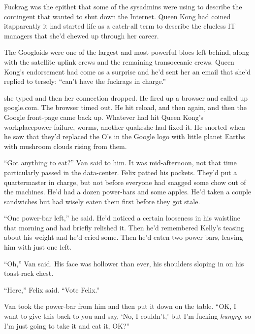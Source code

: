 Fuckrag was the epithet that some of the sysadmins were using to
describe the contingent that wanted to shut down the Internet.
Queen Kong had coined it\dash{}apparently it had started life as a
catch-all term to describe the clueless IT managers that she’d
chewed up through her career.

The Googloids were one of the largest and most powerful blocs left
behind, along with the satellite uplink crews and the remaining
transoceanic crews. Queen Kong’s endorsement had come as a surprise
and he’d sent her an email that she’d replied to tersely: “can’t
have the fuckrags in charge.”

she typed and then her connection dropped. He fired up a browser
and called up google.com. The browser timed out. He hit reload, and
then again, and then the Google front-page came back up. Whatever
had hit Queen Kong’s workplace\dash{}power failure, worms, another
quake\dash{}she had fixed it. He snorted when he saw that they’d replaced
the O’s in the Google logo with little planet Earths with mushroom
clouds rising from them.

\tb

“Got anything to eat?” Van said to him. It was mid-afternoon, not
that time particularly passed in the data-center. Felix patted his
pockets. They’d put a quartermaster in charge, but not before
everyone had snagged some chow out of the machines. He’d had a
dozen power-bars and some apples. He’d taken a couple sandwiches
but had wisely eaten them first before they got stale.

“One power-bar left,” he said. He’d noticed a certain looseness in
his waistline that morning and had briefly relished it. Then he’d
remembered Kelly’s teasing about his weight and he’d cried some.
Then he’d eaten two power bars, leaving him with just one left.

“Oh,” Van said. His face was hollower than ever, his shoulders
sloping in on his toast-rack chest.

“Here,” Felix said. “Vote Felix.”

Van took the power-bar from him and then put it down on the table.
“OK, I want to give this back to you and say, ‘No, I couldn’t,’ but
I’m fucking \emph{hungry}, so I’m just going to take it and eat it,
OK?”

